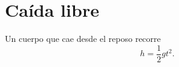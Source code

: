\documentclass{article}
\begin{document}
\section{Caída libre}
Un cuerpo que cae desde el reposo recorre
\begin{equation}
  h = \frac{1}{2} g t^2 .
\end{equation}
\end{document}
